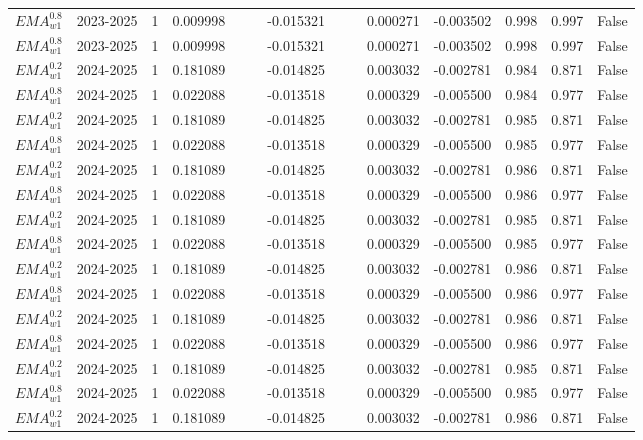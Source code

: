 \begin{tabular}{@{}llrrrrrrrrrlll@{}}
$EMA^{0.8}_{w1}$ & 2023-2025 & 1 & 0.009998 &  &  & -0.015321 &  &  & 0.000271 & -0.003502 & 0.998 & 0.997 & False \\
$EMA^{0.8}_{w1}$ & 2023-2025 & 1 & 0.009998 &  &  & -0.015321 &  &  & 0.000271 & -0.003502 & 0.998 & 0.997 & False \\
$EMA^{0.2}_{w1}$ & 2024-2025 & 1 & 0.181089 &  &  & -0.014825 &  &  & 0.003032 & -0.002781 & 0.984 & 0.871 & False \\
$EMA^{0.8}_{w1}$ & 2024-2025 & 1 & 0.022088 &  &  & -0.013518 &  &  & 0.000329 & -0.005500 & 0.984 & 0.977 & False \\
$EMA^{0.2}_{w1}$ & 2024-2025 & 1 & 0.181089 &  &  & -0.014825 &  &  & 0.003032 & -0.002781 & 0.985 & 0.871 & False \\
$EMA^{0.8}_{w1}$ & 2024-2025 & 1 & 0.022088 &  &  & -0.013518 &  &  & 0.000329 & -0.005500 & 0.985 & 0.977 & False \\
$EMA^{0.2}_{w1}$ & 2024-2025 & 1 & 0.181089 &  &  & -0.014825 &  &  & 0.003032 & -0.002781 & 0.986 & 0.871 & False \\
$EMA^{0.8}_{w1}$ & 2024-2025 & 1 & 0.022088 &  &  & -0.013518 &  &  & 0.000329 & -0.005500 & 0.986 & 0.977 & False \\
$EMA^{0.2}_{w1}$ & 2024-2025 & 1 & 0.181089 &  &  & -0.014825 &  &  & 0.003032 & -0.002781 & 0.985 & 0.871 & False \\
$EMA^{0.8}_{w1}$ & 2024-2025 & 1 & 0.022088 &  &  & -0.013518 &  &  & 0.000329 & -0.005500 & 0.985 & 0.977 & False \\
$EMA^{0.2}_{w1}$ & 2024-2025 & 1 & 0.181089 &  &  & -0.014825 &  &  & 0.003032 & -0.002781 & 0.986 & 0.871 & False \\
$EMA^{0.8}_{w1}$ & 2024-2025 & 1 & 0.022088 &  &  & -0.013518 &  &  & 0.000329 & -0.005500 & 0.986 & 0.977 & False \\
$EMA^{0.2}_{w1}$ & 2024-2025 & 1 & 0.181089 &  &  & -0.014825 &  &  & 0.003032 & -0.002781 & 0.986 & 0.871 & False \\
$EMA^{0.8}_{w1}$ & 2024-2025 & 1 & 0.022088 &  &  & -0.013518 &  &  & 0.000329 & -0.005500 & 0.986 & 0.977 & False \\
$EMA^{0.2}_{w1}$ & 2024-2025 & 1 & 0.181089 &  &  & -0.014825 &  &  & 0.003032 & -0.002781 & 0.985 & 0.871 & False \\
$EMA^{0.8}_{w1}$ & 2024-2025 & 1 & 0.022088 &  &  & -0.013518 &  &  & 0.000329 & -0.005500 & 0.985 & 0.977 & False \\
$EMA^{0.2}_{w1}$ & 2024-2025 & 1 & 0.181089 &  &  & -0.014825 &  &  & 0.003032 & -0.002781 & 0.986 & 0.871 & False \\

\end{tabular}
